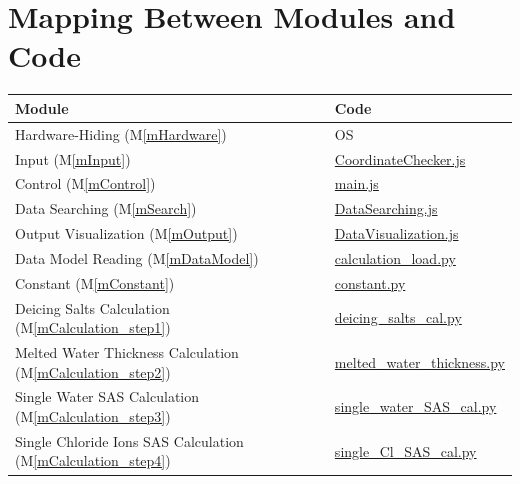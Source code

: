 \documentclass[12pt, titlepage]{article}
\newcommand{\mref}[1]{M\ref{#1}}
\begin{document}
\section{Mapping Between Modules and Code}
\begin{table}[h!]
\centering
\begin{tabular}{p{} p{}}
\toprule
\textbf{Module} & \textbf{Code}\\
\midrule

{Hardware-Hiding (\mref{mHardware})} & OS \\
Input (\mref{mInput}) & \href{https://github.com/smiths/BridgeChlorideExposurePredictor/blob/main/src/web/src/scripts/CoordinateChecker.js}{CoordinateChecker.js}\\
Control (\mref{mControl}) & \href{https://github.com/smiths/BridgeChlorideExposurePredictor/blob/main/src/web/src/main.js}{main.js}\\
Data Searching (\mref{mSearch}) & \href{https://github.com/smiths/BridgeChlorideExposurePredictor/blob/main/src/web/src/scripts/DataSearching.js} {DataSearching.js}\\
Output Visualization (\mref{mOutput}) & \href{https://github.com/smiths/BridgeChlorideExposurePredictor/blob/main/src/web/src/scripts/DataVisualization.js}{DataVisualization.js}\\
Data Model Reading (\mref{mDataModel}) & \href{https://github.com/smiths/BridgeChlorideExposurePredictor/blob/main/src/database/calculation_load.py}{calculation\_load.py}\\
Constant (\mref{mConstant}) & \href{https://github.com/smiths/BridgeChlorideExposurePredictor/blob/main/src/database/constant.py}{constant.py}\\
Deicing Salts Calculation (\mref{mCalculation_step1}) & \href{https://github.com/smiths/BridgeChlorideExposurePredictor/blob/main/src/database/deicing_salts_cal.py}{deicing\_salts\_cal.py}\\
Melted Water Thickness Calculation (\mref{mCalculation_step2}) & \href{https://github.com/smiths/BridgeChlorideExposurePredictor/blob/main/src/database/melted_water_thickness.py}{melted\_water\_thickness.py}\\
Single Water SAS Calculation (\mref{mCalculation_step3}) & \href{https://github.com/smiths/BridgeChlorideExposurePredictor/blob/main/src/database/single_water_SAS_cal.py}{single\_water\_SAS\_cal.py}\\
Single Chloride Ions SAS Calculation (\mref{mCalculation_step4}) & \href{https://github.com/smiths/BridgeChlorideExposurePredictor/blob/main/src/database/single_Cl_SAS_cal.py}{single\_Cl\_SAS\_cal.py}\\

\end{tabular}
\end{table}
\end{document}
